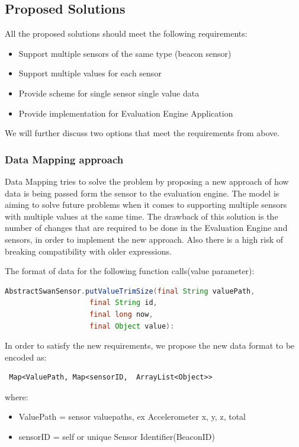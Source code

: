 \subsection{Proposed Solutions}
All the proposed solutions should meet the following requirements:
\begin{itemize}
 \item Support multiple sensors of the same type (beacon sensor)
 \item Support multiple values for each sensor
 \item Provide scheme for single sensor single value data
 \item Provide implementation for Evaluation Engine Application
\end{itemize}

We will further discuss two options that meet the requirements from above.

\subsubsection{Data Mapping approach}
Data Mapping tries to solve the problem by proposing a new approach of how data is being passed form the sensor
to the evaluation engine. The model is aiming to solve future problems when it comes to supporting multiple sensors
with multiple values at the same time. The drawback of this solution is the number of changes that are required to be done in the
Evaluation Engine and sensors, in order to implement the new approach. Also there is a high risk of breaking compatibility
with older expressions.

The format of data for the following function calls(value parameter):
\begin{lstlisting}[language=Java]
 AbstractSwanSensor.putValueTrimSize(final String valuePath,
					final String id,
					final long now,
					final Object value):
\end{lstlisting}

In order to satisfy the new requirements, we propose the new data format to be encoded as: \begin{verbatim} Map<ValuePath, Map<sensorID,  ArrayList<Object>> \end{verbatim}

where:
\begin{itemize}
 \item ValuePath  = sensor valuepaths, ex Accelerometer x, y, z, total
 \item sensorID  =  self or unique Sensor Identifier(BeaconID)
\end{itemize}

